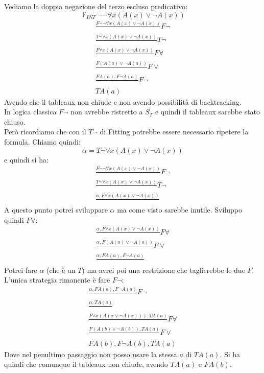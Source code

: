 \documentclass[a4paper,12pt, oneside]{book}
\begin{document}
\begin{esempio}
  Vediamo la doppia negazione del terzo escluso predicativo:
  \[\nvdash_{INT}\neg\neg\forall x(A(x)\lor \neg A(x))\]
  \begin{gather*}
    \frac{F\neg\neg\forall x(A(x)\lor \neg A(x))}{}F\neg\\
    \frac{T\neg\forall x(A(x)\lor\neg A(x))}{}T\neg\\
    \frac{F\forall x(A(x)\lor \neg A(x))}{}F\forall\\
    \frac{F (A(a)\lor \neg A(a))}{}F\lor\\
    \frac{FA(a),F\neg A(a)}{}F\neg\\
    TA(a)  
  \end{gather*}
  Avendo che il tableaux non chiude e non avendo possibilità di backtracking.\\
  In logica classica $F\neg$ non avrebbe ristretto a $S_T$ e quindi il tableaux
  sarebbe stato chiuso.\\
  Però ricordiamo che con il $T\neg$ di Fitting potrebbe essere necessario
  ripetere la formula.
  Chiamo quindi:
  \[\alpha=T\neg\forall x(A(x)\lor\neg A(x))\]
  e quindi si ha:
  \begin{gather*}
    \frac{F\neg\neg\forall x(A(x)\lor \neg A(x))}{}F\neg\\
    \frac{T\neg\forall x(A(x)\lor\neg A(x))}{}T\neg\\
    \frac{\alpha,F\forall x(A(x)\lor \neg A(x))}{}
  \end{gather*}
  A questo punto potrei sviluppare $\alpha$ ma come visto sarebbe
  inutile. Sviluppo quindi $F\forall$:
  \begin{gather*}
    \frac{\alpha,F\forall x(A(x)\lor \neg A(x))}{}F\forall\\
    \frac{\alpha, F(A(a)\lor \neg A(a))}{}F\lor\\
    \frac{\alpha, FA(a), F\neg A(a)}{}
  \end{gather*}
  Potrei fare $\alpha$ (che è un $T$) ma avrei poi una restrizione che
  taglierebbe le due $F$. L'unica strategia rimanente è fare $F\neg$:
  \begin{gather*}
    \frac{\alpha, FA(a), F\neg A(a)}{}F\neg\\
    \frac{\alpha, TA(a)}{}\\
    \frac{F\forall x(A(x\lor\neg A(x))), TA(a)}{}F\forall\\
    \frac{F(A(b)\lor\neg A(b)), TA(a)}{}F\lor\\
    FA(b), F\neg A(b), TA(a)
  \end{gather*}
  Dove nel penultimo passaggio non posso usare la stessa $a$ di $TA(a)$. Si ha
  quindi che comunque il tableaux non chiude, avendo $TA(a)$ e $FA(b)$.
\end{esempio}
\end{document}
